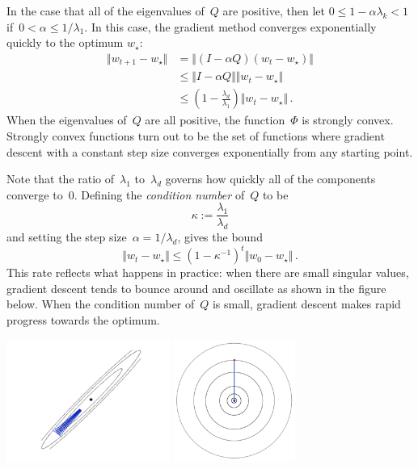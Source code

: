 \documentclass{tufte-book}
\begin{document}
In the case that all of the eigenvalues of~\(Q\) are positive, then let
\(0\leq 1-\alpha \lambda_k <1\) if~\(0<\alpha \leq 1/\lambda_1\). In
this case, the gradient method converges exponentially quickly to the
optimum \(w_\star:\) \[
\begin{aligned}
    \Vert w_{t+1}-w_\star\Vert &= \Vert (I-\alpha Q) (w_t - w_\star)\Vert\\
    &\leq \Vert I-\alpha Q\Vert  \Vert w_t - w_\star \Vert \\
    & \leq \left(1-\frac{\lambda_d}{\lambda_1}\right)\Vert w_t-w_\star\Vert\,.
    \end{aligned}
\] When the eigenvalues of~\(Q\) are all positive, the function~\(\Phi\)
is strongly convex. Strongly convex functions turn out to be the set of
functions where gradient descent with a constant step size converges
exponentially from any starting point.

Note that the ratio of~\(\lambda_1\) to~\(\lambda_d\) governs how
quickly all of the components converge to~\(0\). Defining the
\emph{condition number} of~\(Q\) to be \[
    \kappa:= \frac{\lambda_1}{\lambda_d}
\] and setting the step size~\(\alpha = 1/\lambda_d\), gives the bound
\[
 \Vert w_{t}-w_\star\Vert \leq \left(1 - \kappa^{-1}\right)^t  \Vert w_{0}-w_\star \Vert\,.
\] This rate reflects what happens in practice: when there are small
singular values, gradient descent tends to bounce around and oscillate
as shown in the figure below. When the condition number of~\(Q\) is
small, gradient descent makes rapid progress towards the optimum.

\includegraphics[width=0.4\textwidth,height=\textheight]{assets/gd_osc.png}
\includegraphics[width=0.3\textwidth,height=\textheight]{assets/gd_nice_condition.png}
\end{document}
